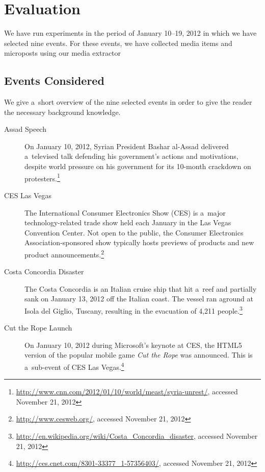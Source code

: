 \section{Evaluation}

We have run experiments in the period of January 10--19, 2012
in which we have selected nine events.
For these events, we have collected media items and microposts
using our media extractor

\subsection{Events Considered}

We give a~short overview of the nine selected events
in order to give the reader the necessary background knowledge.

\begin{description}
  \item[Assad Speech]
       On January 10, 2012, Syrian President Bashar al-Assad
       delivered a~televised talk defending his
       government's actions and motivations, despite world
       pressure on his government for its 10-month
       crackdown on
       protesters.\footnote{\url{http://www.cnn.com/2012/01/10/world/meast/syria-unrest/},
       accessed November 21, 2012}
  \item[CES Las Vegas]
       The International Consumer Electronics Show (CES) is
       a~major technology-related trade show held each January
       in the Las Vegas Convention Center. Not open to the public,
       the Consumer Electronics Association-sponsored show
       typically hosts previews of products and new product
       announcements.\footnote{\url{http://www.cesweb.org/},
       accessed November 21, 2012}
  \item[Costa Concordia Disaster]
       The Costa Concordia is an Italian cruise ship that hit
       a~reef and partially sank on January 13, 2012 off the
       Italian coast. The vessel ran aground at Isola del Giglio,
       Tuscany, resulting in the evacuation of 4,211
       people.\footnote{\url{http://en.wikipedia.org/wiki/Costa_Concordia_disaster},
       accessed November 21, 2012}
  \item[Cut the Rope Launch]
       On January 10, 2012 during Microsoft's keynote at CES, the
       HTML5 version of the popular mobile game \textit{Cut the
       Rope} was announced. This is a~sub-event of CES Las
       Vegas.\footnote{\url{http://ces.cnet.com/8301-33377_1-57356403/},
       accessed November 21, 2012}

\end{description}
